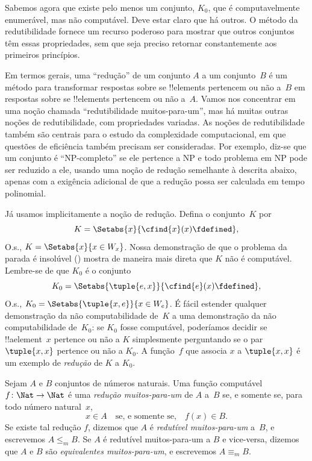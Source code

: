 \documentclass[../../../include/open-logic-section]{subfiles}
\begin{document}

\begin{explain}
Sabemos agora que existe pelo menos um conjunto, $K_0$, que é
computavelmente enumerável, mas não computável. Deve estar claro que
há outros. O método da redutibilidade fornece um recurso poderoso para
mostrar que outros conjuntos têm essas propriedades, sem que seja
preciso retornar constantemente aos primeiros princípios.

Em termos gerais, uma ``redução'' de um conjunto $A$ a um conjunto~$B$
é um método para transformar respostas sobre se !!{element}s pertencem
ou não a~$B$ em respostas sobre se !!{element}s pertencem ou não
a~$A$. Vamos nos concentrar em uma noção chamada ``redutibilidade
muitos-para-um'', mas há muitas outras noções de redutibilidade, com
propriedades variadas. As noções de redutibilidade também são centrais
para o estudo da complexidade computacional, em que questões de
eficiência também precisam ser consideradas. Por exemplo, diz-se que
um conjunto é ``NP-completo'' se ele pertence a NP e todo problema em NP
pode ser reduzido a ele, usando uma noção de redução semelhante à
descrita abaixo, apenas com a exigência adicional de que a redução
possa ser calculada em tempo polinomial.

Já usamos implicitamente a noção de redução. Defina o conjunto~$K$ por
\[
K = \Setabs{x}{\cfind{x}(x) \fdefined},
\]
O.s.\@, $K = \Setabs{x}{x \in W_x}$. Nossa demonstração de que o
problema da parada é insolúvel ()
mostra de maneira mais direta que $K$ não é computável. Lembre-se de
que $K_0$ é o conjunto
\[
K_0 = \Setabs{\tuple{e, x}}{\cfind{e}(x) \fdefined },
\]
O.s.\@, $K_0 = \Setabs{\tuple{x,e}}{x \in W_e}$. É fácil estender
qualquer demonstração da não computabilidade de~$K$ a uma demonstração
da não computabilidade de~$K_0$: se $K_0$ fosse computável, poderíamos
decidir se !!a{element}~$x$ pertence ou não a $K$ simplesmente
perguntando se o par $\tuple{x, x}$ pertence ou não a $K_0$. A
função~$f$ que associa $x$ a $\tuple{x, x}$ é um exemplo de
\emph{redução} de $K$ a $K_0$.
\end{explain}

\begin{defn}
Sejam $A$ e $B$ conjuntos de números naturais. Uma função computável
$f\colon \Nat \to \Nat$ é uma \emph{redução muitos-para-um} de $A$
a~$B$ se, e somente se, para todo número natural~$x$,
\[
x \in A \quad \text{se, e somente se,} \quad f(x) \in B.
\]
Se existe tal redução $f$, dizemos que $A$ é \emph{redutível
muitos-para-um} a~$B$, e escrevemos $A \leq_m B$. Se $A$ é redutível
muitos-para-um a $B$ e vice-versa, dizemos que $A$ e $B$ são
\emph{equivalentes muitos-para-um}, e escrevemos $A \equiv_m B$.
\end{defn}
\end{document}
